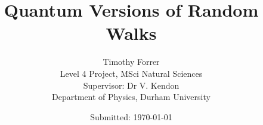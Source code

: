 \documentclass[12pt, onecolumn]{article}
\begin{document}
\title{\bf{Quantum Versions of Random Walks}} 
\date{Submitted: \today{}}
\author{
    Timothy Forrer\\
    Level 4 Project, MSci Natural Sciences\\
    Supervisor: Dr V. Kendon\\
    Department of Physics, Durham University}

\maketitle



\newpage

\tableofcontents

\newpage











\printbibliography[heading=bibintoc]

\newpage


\end{document}
